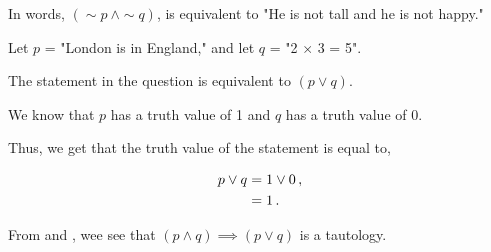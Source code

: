 %
%

\begin{subquestions}
	
	
\subquestion
	
In words, $(\sim p ~\land \sim q)$, is equivalent to "He is not tall and he is not happy."
	
	
\subquestion
	
Let $p$ = "London is in England," and let $q$ = "2 $\times$ 3 = 5". 
	
The statement in the question is equivalent to $(p \lor q)$. 
	
We know that $p$ has a truth value of 1 and $q$ has a truth value of 0. 
	
Thus, we get that the truth value of the statement is equal to,
	
\begin{align}
		p \lor q &= 1 \lor 0\,, \nonumber \\
		&= 1\,.
\end{align}
	
	
\subquestion
	
From  and , wee see that $(p \land q) \implies (p \lor q)$ is a tautology.
	

\end{subquestions}
